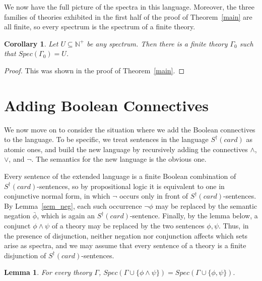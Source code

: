 \documentclass[12pt, reqno]{amsart}
\newtheorem{lemma}[theorem]{Lemma}
\newtheorem{corollary}[theorem]{Corollary}
\theoremstyle{definition}
\theoremstyle{remark}
\newtheorem{remark}[theorem]{Remark}
\numberwithin{equation}{section}
\begin{document}
We now have the full picture of the spectra in this language. Moreover, the three
families of theories exhibited in the first half of the proof of Theorem~\ref{main} are
all finite, so every spectrum is the spectrum of a finite theory.

\begin{corollary}\label{finite}
	Let $U \subseteq \mathbb{N}^+$ be any spectrum. Then there is a finite theory
	$\Gamma_0$ such that $Spec(\Gamma_0) = U$.
\end{corollary}

\begin{proof}
	This was shown in the proof of Theorem~\ref{main}.
\end{proof}




\newpage
\section{Adding Boolean Connectives}
We now move on to consider the situation where we add the Boolean connectives to the language. To be specific, we treat sentences in the language $S^{\dagger}(card)$ as atomic ones, and build the new language by recursively adding the connectives $\land$, $\lor$, and $\neg$. The semantics for the new language is the obvious one. 

Every sentence of the extended language is a finite Boolean combination of
$S^{\dagger}(card)$-sentences, so by propositional logic it is equivalent to one in conjunctive
normal form, in which $\neg$ occurs only in front of $S^{\dagger}(card)$-sentences. By
Lemma~\ref{sem_neg}, each such occurrence $\neg \phi$ may be replaced by the semantic
negation $\bar{\phi}$, which is again an $S^{\dagger}(card)$-sentence. Finally, by the lemma below,
a conjunct $\phi \wedge \psi$ of a theory may be replaced by the two sentences
$\phi, \psi$. Thus, in the presence of disjunction, neither negation nor conjunction
affects which sets arise as spectra, and we may assume that every sentence of a theory is
a finite disjunction of $S^{\dagger}(card)$-sentences.


\begin{lemma}
For every theory $\Gamma$, $Spec(\Gamma\cup\{\phi\wedge\psi\})
= Spec(\Gamma\cup\{\phi,\psi\}).$ 
\end{lemma}
\end{document}
